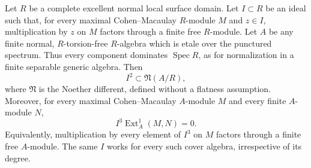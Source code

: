 \begin{lemma}
\label{D:cover-uniform-MCM-annihilator}
Let $R$ be a complete excellent normal local surface domain. Let
$I\subset R$ be an ideal such that, for every maximal Cohen--Macaulay
$R$-module $M$ and $z\in I$, multiplication by $z$ on $M$ factors
through a finite free $R$-module. Let $A$ be any finite normal,
$R$-torsion-free $R$-algebra which is etale over the punctured spectrum.
Thus every component dominates $\operatorname{Spec}R$, as for
normalization in a finite separable generic algebra. Then
\[
 I^2\subset\mathfrak N(A/R),
\]
where $\mathfrak N$ is the Noether different, defined without a
flatness assumption. Moreover, for every maximal Cohen--Macaulay
$A$-module $M$ and every finite $A$-module $N$,
\[
 I^3\operatorname{Ext}^1_A(M,N)=0.
\]
Equivalently, multiplication by every element of $I^3$ on $M$
factors through a finite free $A$-module. The same $I$ works for
every such cover algebra, irrespective of its degree.
\end{lemma}
